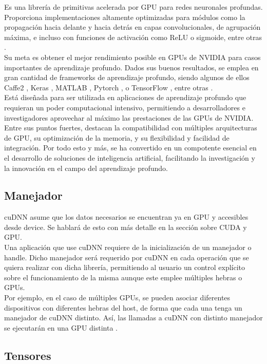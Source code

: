 Es una librería de primitivas acelerada por GPU para redes neuronales profundas. Proporciona implementaciones altamente optimizadas para módulos como la propagación hacia delante y hacia detrás en capas convolucionales, de agrupación máxima, e incluso con funciones de activación como ReLU o sigmoide, entre otras \cite{cuDNN}. \\
Su meta es obtener el mejor rendimiento posible en GPUs de NVIDIA para casos importantes de aprendizaje profundo. Dados sus buenos resultados, se emplea en gran cantidad de frameworks de aprendizaje profundo, siendo algunos de ellos Caffe2 \cite{Caffe2}, Keras \cite{Keras}, MATLAB \cite{Matlab}, Pytorch \cite{Pytorch}, o TensorFlow \cite{Tensorflow}, entre otras \cite{cuDNN_librerias}. \\
Está diseñada para ser utilizada en aplicaciones de aprendizaje profundo que requieran un poder computacional intensivo, permitiendo a desarrolladores e investigadores aprovechar al máximo las prestaciones de las GPUs de NVIDIA. Entre sus puntos fuertes, destacan la compatibilidad con múltiples arquitecturas de  GPU, su optimización de la memoria, y su flexibilidad y facilidad de integración. Por todo esto y más, se ha convertido en un compotente esencial en el desarrollo de soluciones de inteligencia artificial, facilitando la investigación y la innovación en el campo del aprendizaje profundo.


\subsection{Manejador}

cuDNN asume que los datos necesarios se encuentran ya en GPU y accesibles desde device. Se hablará de esto con más detalle en la sección sobre CUDA y GPU. \\
Una aplicación que use cuDNN requiere de la inicialización de un manejador o handle. Dicho manejador será requerido por cuDNN en cada operación que se quiera realizar con dicha librería, permitiendo al usuario un control explícito sobre el funcionamiento de la misma aunque este emplee múltiples hebras o GPUs. \\
Por ejemplo, en el caso de múltiples GPUs, se pueden asociar diferentes dispositivos con diferentes hebras del host, de forma que cada una tenga un manejador de cuDNN distinto. Así, las llamadas a cuDNN con distinto manejador se ejecutarán en una GPU distinta \cite{cuDNN_core_concepts}.

\subsection{Tensores}

